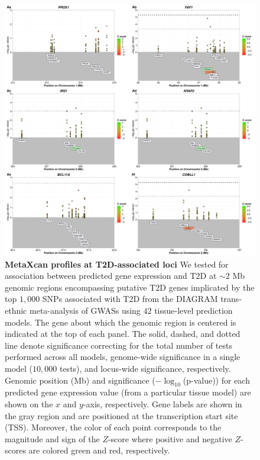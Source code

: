 \documentclass[10pt]{article}
\date{}
\begin{document}
\begin{figure}
\includegraphics[width=\textwidth]{sup_fig1_part1_locusArray.pdf}
	\caption{\textbf{MetaXcan profiles at T2D-associated loci} We tested for association between predicted gene expression and T2D at $\sim2$ Mb genomic regions encompassing putative T2D genes implicated by the top $1,000$ SNPs associated with T2D from the DIAGRAM trans-ethnic meta-analysis of GWASs using $42$ tissue-level prediction models. The gene about which the genomic region is centered is indicated at the top of each panel. The solid, dashed, and dotted line denote significance correcting for the total number of tests performed across all models, genome-wide significance in a single model ($10,000$ tests), and locus-wide significance, respectively. Genomic position (Mb) and significance ($-\log_{10}$(p-value)) for each predicted gene expression value (from a particular tissue model) are shown on the $x$ and $y$-axis, respectively. Gene labels are shown in the gray region and are positioned at the transcription start site (TSS). Moreover, the color of each point corresponds to the magnitude and sign of the $Z$-score where positive and negative $Z$-scores are colored green and red, respectively.} 
    \label{fig:supp.locus_array_fig1_part1}
\end{figure}
\end{document}
